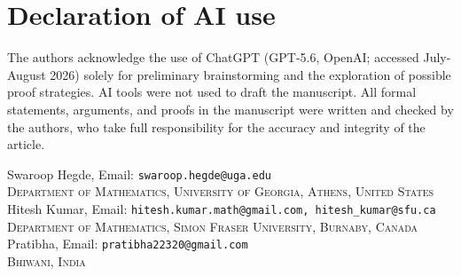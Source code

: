 \documentclass[11pt]{article}
\theoremstyle{plain}
\numberwithin{equation}{section}
\newcommand{\affl}[3]{\noindent #1, Email: {\tt #2}\\ \textsc{#3}\\[1.5pt]}
\begin{document}
\section*{Declaration of AI use}

The authors acknowledge the use of ChatGPT (GPT-5.6, OpenAI; accessed July-August 2026) solely for preliminary brainstorming and the exploration of possible proof strategies. AI tools were not used to draft the manuscript. All formal statements, arguments, and proofs in the manuscript were written and checked by the authors, who take full responsibility for the accuracy and integrity of the article.




\vspace{0.4cm}

\affl{Swaroop Hegde}{swaroop.hegde@uga.edu}{Department of Mathematics, University of Georgia, Athens, United States}

\affl{Hitesh Kumar}{hitesh.kumar.math@gmail.com, hitesh\_kumar@sfu.ca}{Department of Mathematics, Simon Fraser University, Burnaby, Canada}

\affl{Pratibha}{pratibha22320@gmail.com}{Bhiwani, India}
\end{document}
